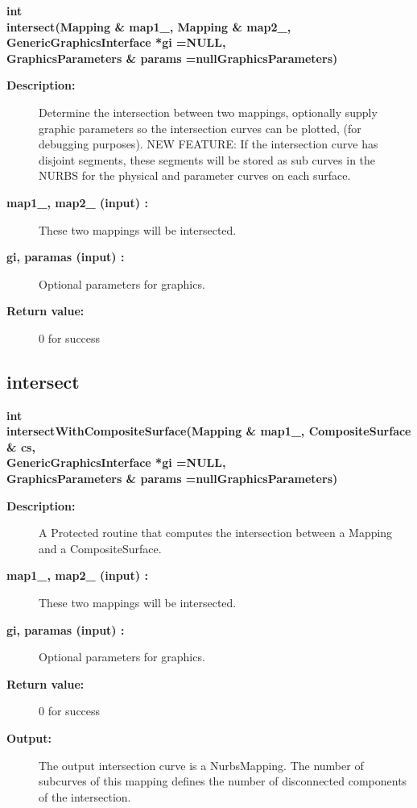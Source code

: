 \begin{flushleft} \textbf{%
int  \\ 
\settowidth{\IntersectionMappingIncludeArgIndent}{intersect(}%
intersect(Mapping \& map1\_, Mapping \& map2\_,\\ 
\hspace{\IntersectionMappingIncludeArgIndent}GenericGraphicsInterface *gi  =NULL,\\ 
\hspace{\IntersectionMappingIncludeArgIndent}GraphicsParameters \& params  =nullGraphicsParameters)
}\end{flushleft}
\begin{description}
\item[{\bf Description:}] 
   Determine the intersection between two mappings, optionally supply graphic parameters
    so the intersection curves can be plotted, (for debugging purposes).
   NEW FEATURE: If the intersection curve has disjoint segments, these segments will be 
   stored as sub curves in the NURBS for the physical and parameter curves on each surface.
\item[{\bf map1\_, map2\_ (input) :}]  These two mappings will be intersected.
\item[{\bf gi, paramas (input) :}]  Optional parameters for graphics.
\item[{\bf Return value:}]  0 for success
\end{description}
\subsection{intersect}
 
\begin{flushleft} \textbf{%
int  \\ 
\settowidth{\IntersectionMappingIncludeArgIndent}{intersectWithCompositeSurface(}%
intersectWithCompositeSurface(Mapping \& map1\_, CompositeSurface \& cs,\\ 
\hspace{\IntersectionMappingIncludeArgIndent}GenericGraphicsInterface *gi  =NULL,\\ 
\hspace{\IntersectionMappingIncludeArgIndent}GraphicsParameters \& params  =nullGraphicsParameters)
}\end{flushleft}
\begin{description}
\item[{\bf Description:}] 
    A Protected routine that computes the intersection between a Mapping
 and a CompositeSurface. 

\item[{\bf map1\_, map2\_ (input) :}]  These two mappings will be intersected.
\item[{\bf gi, paramas (input) :}]  Optional parameters for graphics.
\item[{\bf Return value:}]  0 for success

\item[{\bf Output:}]  The output intersection curve is a NurbsMapping. The number of subcurves of this
 mapping defines the number of disconnected components of the intersection.

\end{description}
